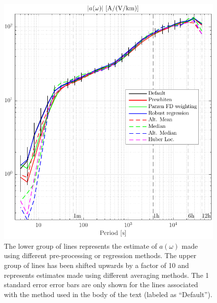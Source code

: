 \documentclass[draft,linenumbers]{agujournal2018}
\begin{document}
\clearpage

\begin{figure}[h]
\centering
\includegraphics[width=\textwidth]{figures/plot_options_comparison_a.pdf}
\caption{The lower group of lines represents the estimate of $a(\omega)$ made using different pre-processing or regression methods. The upper group of lines has been shifted upwards by a factor of 10 and represents estimates made using different averaging methods. The 1 standard error error bars are only shown for the lines associated with the method used in the body of the text (labeled as ``Default'').}
\label{a_variations}
\end{figure}
\end{document}
